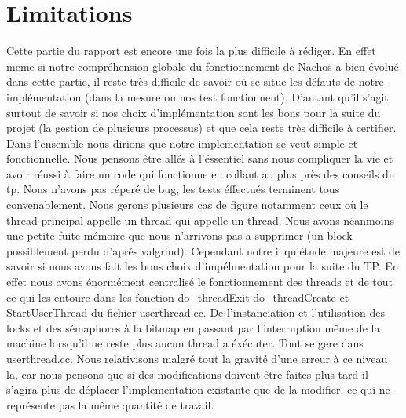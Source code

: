 \documentclass[12pt]{article}
\begin{document}
\section{Limitations}

Cette partie du rapport est encore une fois la plus difficile à rédiger. En effet
meme si notre compréhension globale du fonctionnement de Nachos a bien évolué dans
cette partie, il reste très difficile de savoir où se situe les défauts de notre
implémentation (dans la mesure ou nos test fonctionnent). D'autant qu'il s'agit surtout
de savoir si nos choix d'implémentation sont les bons pour la suite du projet (la gestion
de plusieurs processus) et que cela reste très difficile à certifier.
\newline
\newline
Dans l'ensemble nous dirions que notre implementation se veut simple et fonctionnelle.
Nous pensons être allés à l'éssentiel sans nous compliquer la vie et avoir réussi à faire
un code qui fonctionne en collant au plus près des conseils du tp.
Nous n'avons pas réperé de bug, les tests éffectués terminent tous convenablement. Nous gerons plusieurs
cas de figure notamment ceux où le thread principal appelle un thread qui appelle un thread.
\newline
\newline
Nous avons néanmoins une petite fuite mémoire que nous n'arrivons pas a
supprimer (un block possiblement perdu d'aprés valgrind).
Cependant notre inquiétude majeure est de savoir si nous avons fait les bons choix d'impélmentation
pour la suite du TP. En effet nous avons énormément centralisé le fonctionnement des
threads et de tout ce qui les entoure dans les fonction do_threadExit
do_threadCreate et StartUserThread du fichier userthread.cc.
De l'instanciation et l'utilisation des locks et des sémaphores à la bitmap en passant par
l'interruption même de la machine lorsqu'il ne reste plus aucun thread a éxécuter. Tout
se gere dans userthread.cc.
Nous relativisons malgré tout la gravité d'une erreur à ce niveau la, car nous pensons que si
des modifications doivent être faites plus tard il s'agira plus de déplacer l'implementation existante que de
la modifier, ce qui ne représente pas la même quantité de travail.
\end{document}
